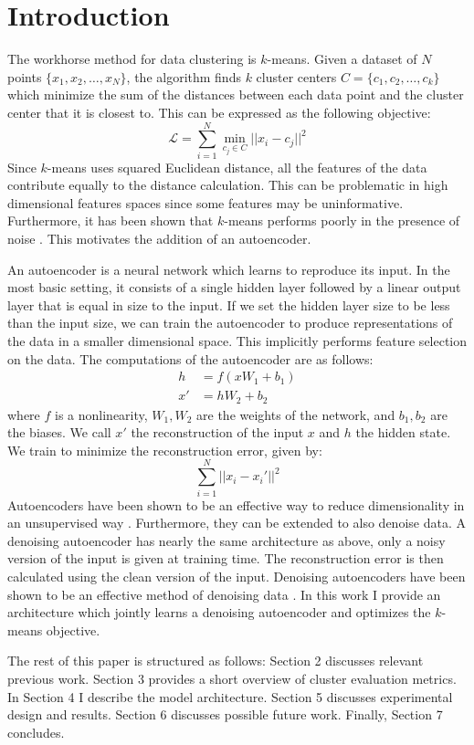 \section{Introduction}
The workhorse method for data clustering is $k$-means. Given a dataset of $N$ points $\{x_1,x_2,\dots, x_N\}$, the algorithm finds $k$ cluster centers $C=\{c_1,c_2,\dots,c_k \}$ which minimize the sum of the distances between each data point and the cluster center that it is closest to. This can be expressed as the following objective:
\begin{equation}
\mathcal{L} = \sum_{i=1}^N \min_{c_j \in C} ||x_i - c_j||^2
\end{equation}
Since $k$-means uses squared Euclidean distance, all the features of the data contribute equally to the distance calculation. This can be problematic in high dimensional features spaces since some features may be uninformative. Furthermore, it has been shown that $k$-means performs poorly in the presence of noise \cite{noisecluster}. This motivates the addition of an autoencoder.

An autoencoder is a neural network which learns to reproduce its input. In the most basic setting, it consists of a single hidden layer followed by a linear output layer that is equal in size to the input. If we set the hidden layer size to be less than the input size, we can train the autoencoder to produce representations of the data in a smaller dimensional space. This implicitly performs feature selection on the data. The computations of the autoencoder are as follows:
\begin{equation}
\begin{aligned}
h &= f(xW_1 + b_1)\\
x' &= hW_2 + b_2
\end{aligned}
\end{equation}
where $f$ is a nonlinearity, $W_1,W_2$ are the weights of the network, and $b_1,b_2$ are the biases. We call $x'$ the reconstruction of the input $x$ and $h$ the hidden state. We train to minimize the reconstruction error, given by:
\begin{equation}
\sum_{i=1}^N ||x_i - x_i'||^2
\end{equation}
Autoencoders have been shown to be an effective way to reduce dimensionality in an unsupervised way \cite{noiseae}. Furthermore, they can be extended to also denoise data. A denoising autoencoder has nearly the same architecture as above, only a noisy version of the input is given at training time. The reconstruction error is then calculated using the clean version of the input. Denoising autoencoders have been shown to be an effective method of denoising data \cite{noiseae}. In this work I provide an architecture which jointly learns a denoising autoencoder and optimizes the $k$-means objective.

The rest of this paper is structured as follows: Section 2 discusses relevant previous work. Section 3 provides a short overview of cluster evaluation metrics. In Section 4 I describe the model architecture. Section 5 discusses experimental design and results.  Section 6 discusses possible future work. Finally, Section 7 concludes.